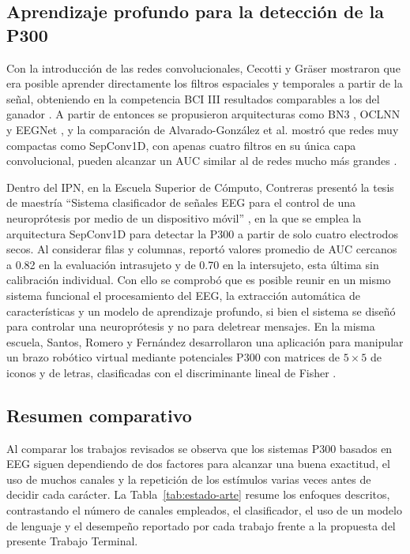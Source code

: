 \subsection{Aprendizaje profundo para la detección de la P300}

Con la introducción de las redes convolucionales, Cecotti y Gräser mostraron que era posible
aprender directamente los filtros espaciales y temporales a partir de la señal, obteniendo en la
competencia BCI III resultados comparables a los del ganador \cite{cecotti2011}. A partir de
entonces se propusieron arquitecturas como BN3 \cite{liu2018}, OCLNN \cite{shan2018} y EEGNet
\cite{lawhern2018}, y la comparación de Alvarado-González et al. mostró que redes muy compactas
como SepConv1D, con apenas cuatro filtros en su única capa convolucional, pueden alcanzar un AUC
similar al de redes mucho más grandes \cite{alvarado2021}.

Dentro del IPN, en la Escuela Superior de Cómputo, Contreras presentó la tesis de maestría
``Sistema clasificador de señales EEG para el control de una neuroprótesis por medio de un
dispositivo móvil'' \cite{contreras2021}, en la que se emplea la arquitectura SepConv1D para
detectar la P300 a partir de solo cuatro electrodos secos. Al considerar filas y
columnas, reportó valores promedio de AUC cercanos a 0.82 en la evaluación intrasujeto y de 0.70 en
la intersujeto, esta última sin calibración individual. Con ello
se comprobó que es posible reunir en un mismo sistema funcional el procesamiento del EEG, la
extracción automática de características y un modelo de aprendizaje profundo, si bien el sistema se
diseñó para controlar una neuroprótesis y no para deletrear mensajes. En la misma escuela, Santos,
Romero y Fernández desarrollaron una aplicación para manipular un brazo robótico virtual mediante
potenciales P300 con matrices de $5\times5$ de iconos y de letras, clasificadas con el
discriminante lineal de Fisher \cite{santos2017}.

\subsection{Resumen comparativo}

Al comparar los trabajos revisados se observa que los sistemas P300 basados en EEG siguen
dependiendo de dos factores para alcanzar una buena exactitud, el uso de muchos canales y la
repetición de los estímulos varias veces antes de decidir cada carácter. La
Tabla~\ref{tab:estado-arte} resume los enfoques descritos, contrastando el número de canales
empleados, el clasificador, el uso de un modelo de lenguaje y el desempeño reportado por cada
trabajo frente a la propuesta del presente Trabajo Terminal.

